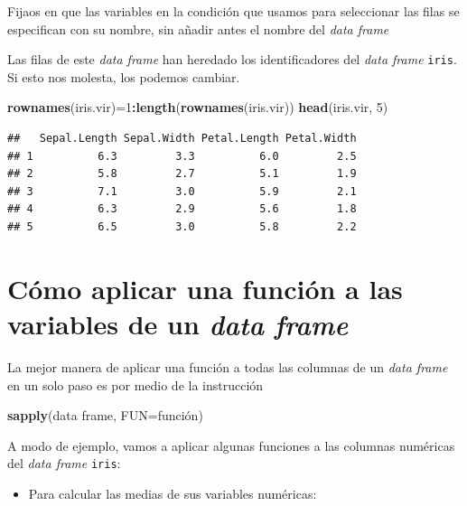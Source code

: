 \documentclass[]{book}
\newenvironment{Shaded}{\begin{snugshade}}{\end{snugshade}}
\newcommand{\DataTypeTok}[1]{\textcolor[rgb]{0.13,0.29,0.53}{#1}}
\newcommand{\DecValTok}[1]{\textcolor[rgb]{0.00,0.00,0.81}{#1}}
\newcommand{\KeywordTok}[1]{\textcolor[rgb]{0.13,0.29,0.53}{\textbf{#1}}}
\newcommand{\NormalTok}[1]{#1}
\newcommand{\OperatorTok}[1]{\textcolor[rgb]{0.81,0.36,0.00}{\textbf{#1}}}
\providecommand{\tightlist}{%
  \setlength{\itemsep}{0pt}\setlength{\parskip}{0pt}}
\theoremstyle{definition}
\theoremstyle{definition}
\theoremstyle{definition}
\theoremstyle{remark}
\begin{document}
Fijaos en que las variables en la condición que usamos para seleccionar las filas se especifican con su nombre, sin añadir antes el nombre del \emph{data frame}

Las filas de este \emph{data frame} han heredado los identificadores del \emph{data frame} \texttt{iris}. Si esto nos molesta, los podemos cambiar.

\begin{Shaded}
\begin{Highlighting}[]
\KeywordTok{rownames}\NormalTok{(iris.vir)=}\DecValTok{1}\OperatorTok{:}\KeywordTok{length}\NormalTok{(}\KeywordTok{rownames}\NormalTok{(iris.vir))}
\KeywordTok{head}\NormalTok{(iris.vir, }\DecValTok{5}\NormalTok{)}
\end{Highlighting}
\end{Shaded}

\begin{verbatim}
##   Sepal.Length Sepal.Width Petal.Length Petal.Width
## 1          6.3         3.3          6.0         2.5
## 2          5.8         2.7          5.1         1.9
## 3          7.1         3.0          5.9         2.1
## 4          6.3         2.9          5.6         1.8
## 5          6.5         3.0          5.8         2.2
\end{verbatim}

\hypertarget{como-aplicar-una-funcion-a-las-variables-de-un-data-frame}{%
\section{\texorpdfstring{Cómo aplicar una función a las variables de un \emph{data frame}}{Cómo aplicar una función a las variables de un data frame}}\label{como-aplicar-una-funcion-a-las-variables-de-un-data-frame}}

La mejor manera de aplicar una función a todas las columnas de un \emph{data frame} en un solo paso es por medio de la instrucción

\begin{Shaded}
\begin{Highlighting}[]
\KeywordTok{sapply}\NormalTok{(data frame, }\DataTypeTok{FUN=}\NormalTok{función)}
\end{Highlighting}
\end{Shaded}

A modo de ejemplo, vamos a aplicar algunas funciones a las columnas numéricas del \emph{data frame} \texttt{iris}:

\begin{itemize}
\tightlist
\item
  Para calcular las medias de sus variables numéricas:
\end{itemize}
\end{document}
